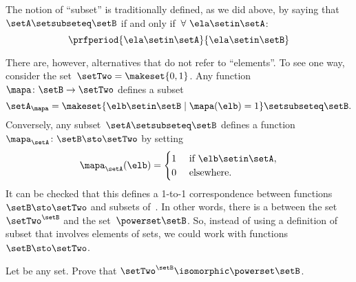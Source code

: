 \begin{example}
    The notion of ``subset'' is traditionally defined, as we did above, by saying that~$\setA \setsubseteq \setB$ if and only if~$\forall \ \ela \setin\setA$:
    \begin{equation}
        \prfperiod{
            \ela \setin\setA
        }{
            \ela \setin\setB
        }
    \end{equation}

    There are, however, alternatives that do not refer to ``elements''.
    To see one way, consider the set~$\setTwo = \makeset{ 0, 1}$.
    Any function~$\mapa \colon \setB \to \setTwo$ defines a subset
    \begin{equation}
        \setA_\mapa = \makeset{ \elb \setin\setB \mid \mapa(\elb) = 1 } \setsubseteq \setB.
    \end{equation}
    Conversely, any subset~$\setA \setsubseteq \setB$ defines a function~$\mapa_\setA \colon \setB \sto \setTwo$ by setting
    \begin{equation}
        \mapa_\setA(\elb) = \begin{cases}
            1 & \text{ if }\elb\setin\setA, \\
            0 & \text{ elsewhere}.
        \end{cases}
    \end{equation}
    It can be checked that this defines a 1-to-1 correspondence between functions~$\setB \sto \setTwo$ and subsets of~\setB.
    In other words, there is a  between the set~$\setTwo^\setB$ and the set~$\powerset \setB$.
    So, instead of using a definition of subset that involves elements of sets, we could work with functions~$\setB \sto \setTwo$.
\end{example}

\begin{gradedexercise}
    \label{ex:SubsetsAsFunctions}

    Let \setB be any set.
    Prove that $\setTwo^\setB \isomorphic \powerset \setB$.
\end{gradedexercise}


